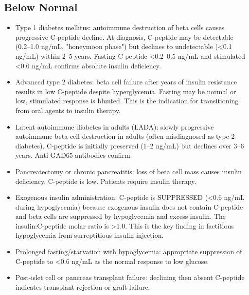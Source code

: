 \subsection*{Below Normal}
\begin{itemize}
  \item Type 1 diabetes mellitus: autoimmune destruction of beta cells causes progressive C-peptide decline. At diagnosis, C-peptide may be detectable (0.2--1.0 ng/mL, "honeymoon phase") but declines to undetectable (<0.1 ng/mL) within 2--5 years. Fasting C-peptide <0.2--0.5 ng/mL and stimulated <0.6 ng/mL confirms absolute insulin deficiency.
  \item Advanced type 2 diabetes: beta cell failure after years of insulin resistance results in low C-peptide despite hyperglycemia. Fasting may be normal or low, stimulated response is blunted. This is the indication for transitioning from oral agents to insulin therapy.
  \item Latent autoimmune diabetes in adults (LADA): slowly progressive autoimmune beta cell destruction in adults (often misdiagnosed as type 2 diabetes). C-peptide is initially preserved (1--2 ng/mL) but declines over 3--6 years. Anti-GAD65 antibodies confirm.
  \item Pancreatectomy or chronic pancreatitis: loss of beta cell mass causes insulin deficiency. C-peptide is low. Patients require insulin therapy.
  \item Exogenous insulin administration: C-peptide is SUPPRESSED (<0.6 ng/mL during hypoglycemia) because exogenous insulin does not contain C-peptide and beta cells are suppressed by hypoglycemia and excess insulin. The insulin:C-peptide molar ratio is >1.0. This is the key finding in factitious hypoglycemia from surreptitious insulin injection.
  \item Prolonged fasting/starvation with hypoglycemia: appropriate suppression of C-peptide to <0.6 ng/mL as the normal response to low glucose.
  \item Post-islet cell or pancreas transplant failure: declining then absent C-peptide indicates transplant rejection or graft failure.
\end{itemize}


